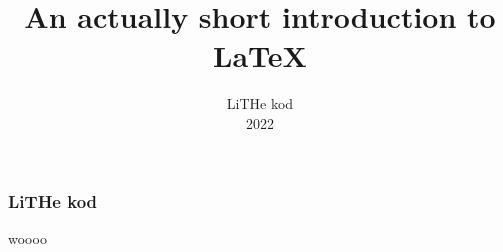 \documentclass{beamer}
\title[Git]{An actually short introduction to \LaTeX}
\author{LiTHe kod \\ 2022}
\date{}
\begin{document}
\frame{\titlepage}
\frame{\tableofcontents}


\begin{frame}[fragile]
  \frametitle{LiTHe kod}

  woooo


\end{frame}
\end{document}
